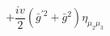 %
\begin{dmath*}
%
  +  \frac{i v}{2}\left({\bar g}^{\prime 2} + {\bar g}{}^2\right) \eta_{\mu_2 \mu_3}
%
\end{dmath*}
%
